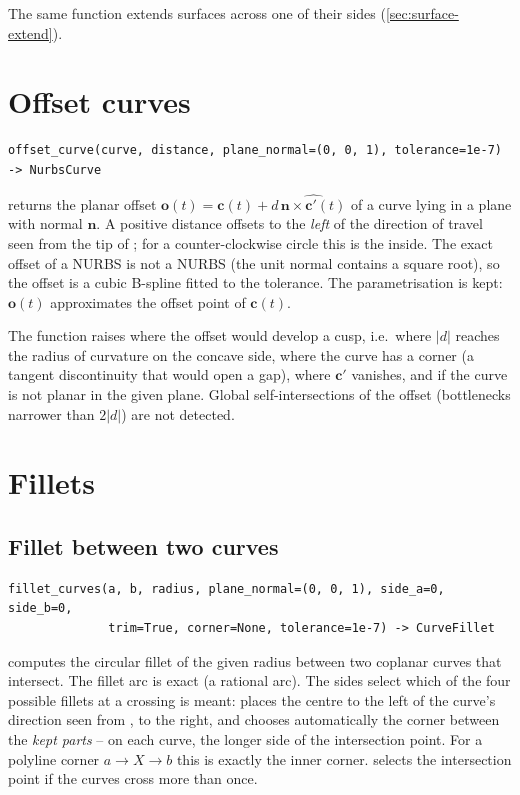The same function extends surfaces across one of their sides (\cref{sec:surface-extend}).

\section{Offset curves}\label{sec:offset-curve}

\begin{lstlisting}[style=text]
offset_curve(curve, distance, plane_normal=(0, 0, 1), tolerance=1e-7) -> NurbsCurve
\end{lstlisting}

 returns the planar offset
$\mathbf o(t) = \mathbf c(t) + d\,\widehat{\mathbf n \times \mathbf c'(t)}$ of a curve lying in a
plane with normal $\mathbf n$. A positive distance offsets to the \emph{left} of the direction of
travel seen from the tip of ; for a counter-clockwise circle this is the
inside. The exact offset of a NURBS is not a NURBS (the unit normal contains a square root), so
the offset is a cubic B-spline fitted to the tolerance. The parametrisation is kept: $\mathbf
o(t)$ approximates the offset point of $\mathbf c(t)$.

The function raises  where the offset would develop a cusp, i.e.\ where
$|d|$ reaches the radius of curvature on the concave side, where the curve has a corner (a
tangent discontinuity that would open a gap), where $\mathbf c'$ vanishes, and if the curve is not
planar in the given plane. Global self-intersections of the offset (bottlenecks narrower than
$2|d|$) are not detected.

\section{Fillets}\label{sec:curve-fillets}

\subsection{Fillet between two curves}

\begin{lstlisting}[style=text]
fillet_curves(a, b, radius, plane_normal=(0, 0, 1), side_a=0, side_b=0,
              trim=True, corner=None, tolerance=1e-7) -> CurveFillet
\end{lstlisting}

 computes the circular fillet of the given radius between two coplanar
curves that intersect. The fillet arc is exact (a rational arc). The sides select which of the
four possible fillets at a crossing is meant:  places the centre to the left of the
curve's direction seen from ,  to the right, and  chooses
automatically the corner between the \emph{kept parts} -- on each curve, the longer side of the
intersection point. For a polyline corner $a \to X \to b$ this is exactly the inner corner.
 selects the intersection point if the curves cross more than once.

